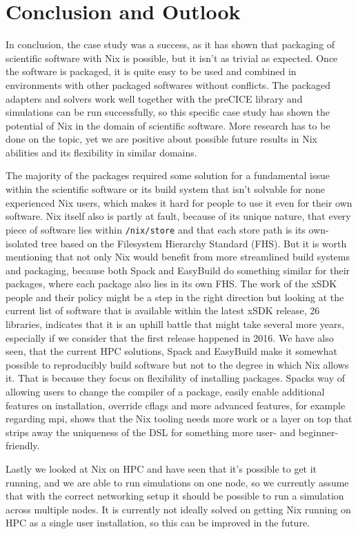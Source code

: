 \documentclass{eceasst}
\begin{document}
\section{Conclusion and Outlook}

In conclusion, the case study was a success, as it has shown that packaging of scientific software with Nix is possible, but it isn't as trivial as expected.
Once the software is packaged, it is quite easy to be used and combined in environments with other packaged softwares without conflicts.
The packaged adapters and solvers work well together with the preCICE library and simulations can be run successfully, so this specific case study has shown the potential of Nix in the domain of scientific software.
More research has to be done on the topic, yet we are positive about possible future results in Nix abilities and its flexibility in similar domains.

The majority of the packages required some solution for a fundamental issue within the scientific software or its build system that isn't solvable for none experienced Nix users, which makes it hard for people to use it even for their own software.
Nix itself also is partly at fault, because of its unique nature, that every piece of software lies within \texttt{/nix/store} and that each store path is its own-isolated tree based on the Filesystem Hierarchy Standard (FHS).
But it is worth mentioning that not only Nix would benefit from more streamlined build systems and packaging, because both Spack and EasyBuild do something similar for their packages, where each package also lies in its own FHS.
The work of the xSDK people and their policy might be a step in the right direction but looking at the current list of software that is available within the latest xSDK release, 26 libraries, indicates that it is an uphill battle that might take several more years, especially if we consider that the first release happened in 2016.
We have also seen, that the current HPC solutions, Spack and EasyBuild make it somewhat possible to reproducibly build software but not to the degree in which Nix allows it.
That is because they focus on flexibility of installing packages.
Spacks way of allowing users to change the compiler of a package, easily enable additional features on installation, override cflags and more advanced features, for example regarding mpi, shows that the Nix tooling needs more work or a layer on top that strips away the uniqueness of the DSL for something more user- and beginner-friendly.

Lastly we looked at Nix on HPC and have seen that it's possible to get it running, and we are able to run simulations on one node, so we currently assume that with the correct networking setup it should be possible to run a simulation across multiple nodes.
It is currently not ideally solved on getting Nix running on HPC as a single user installation, so this can be improved in the future.
\end{document}
